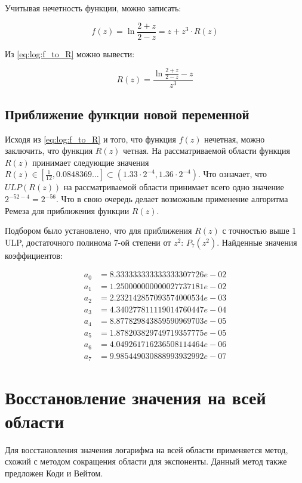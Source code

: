 Учитывая нечетность функции, можно записать:

\begin{equation}
    f(z) = \ln{\frac{2 + z}{2 - z}} = z + z^3 \cdot R(z)
    \label{eq:log:f_to_R}
\end{equation}

Из \ref{eq:log:f_to_R} можно вывести:

\begin{equation}
    R(z) = \frac{\ln{\frac{2 + z}{2 - z}} - z}{z^3}
\end{equation}

\subsection{Приближение функции новой переменной}

Исходя из \ref{eq:log:f_to_R} и того, что функция $f(z)$ нечетная, можно заключить, что функция $R(z)$ четная.
На рассматриваемой области функция $R(z)$ принимает следующие значения $R(z) \in [\frac{1}{12}, 0.0848369\ldots] \subset (1.33 \cdot 2^{-4}, 1.36 \cdot 2^{-4})$.
Что означает, что $ULP(R(z))$ на рассматриваемой области принимает всего одно значение $2^{-52-4}=2^{-56}$.
Что в свою очередь делает возможным применение алгоритма Ремеза для приближения функции $R(z)$.

Подбором было установлено, что для приближения $R(z)$ с точностью выше 1 ULP, достаточного полинома 7-ой степени от $z^2$: $P_7(z^2)$.
Найденные значения коэффициентов:

\begin{align*}
    a_0 &= 8.333333333333333307726e-02 \\
    a_1 &= 1.250000000000027737181e-02 \\
    a_2 &= 2.232142857093574000534e-03 \\
    a_3 &= 4.340277811119014760447e-04 \\
    a_4 &= 8.877829843859590969703e-05 \\
    a_5 &= 1.878203829749719357775e-05 \\
    a_6 &= 4.049261716236508114464e-06 \\
    a_7 &= 9.985449030888993932992e-07
\end{align*}

\section{Восстановление значения на всей области}

Для восстановления значения логарифма на всей области применяется метод, схожий с методом сокращения области для экспоненты.
Данный метод также предложен Коди и Вейтом\cite{cody-waite}.

